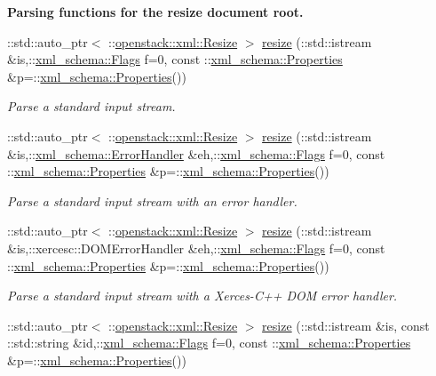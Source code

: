 \begin{Indent}{\bf Parsing functions for the resize document root.}
\begin{DoxyCompactItemize}
::std::auto\_\-ptr$<$ ::\hyperlink{classopenstack_1_1xml_1_1Resize}{openstack::xml::Resize} $>$ \hyperlink{namespaceopenstack_1_1xml_a12554fd6e38a6e9d8ddb3f9bea9f1494}{resize} (::std::istream \&is,::\hyperlink{namespacexml__schema_affb4c227cbd9aa7453dd1dc5a1401943}{xml\_\-schema::Flags} f=0, const ::\hyperlink{namespacexml__schema_ad27ce19a7ee1d3b1064092648898f64c}{xml\_\-schema::Properties} \&p=::\hyperlink{namespacexml__schema_ad27ce19a7ee1d3b1064092648898f64c}{xml\_\-schema::Properties}())
\begin{DoxyCompactList}\small\item\em Parse a standard input stream. \item\end{DoxyCompactList}\item 
::std::auto\_\-ptr$<$ ::\hyperlink{classopenstack_1_1xml_1_1Resize}{openstack::xml::Resize} $>$ \hyperlink{namespaceopenstack_1_1xml_ae7fc6ce3b8d429caba4f4bfb7f44478f}{resize} (::std::istream \&is,::\hyperlink{namespacexml__schema_ab1c9361bfd3b404eaabf0c31eded79dc}{xml\_\-schema::ErrorHandler} \&eh,::\hyperlink{namespacexml__schema_affb4c227cbd9aa7453dd1dc5a1401943}{xml\_\-schema::Flags} f=0, const ::\hyperlink{namespacexml__schema_ad27ce19a7ee1d3b1064092648898f64c}{xml\_\-schema::Properties} \&p=::\hyperlink{namespacexml__schema_ad27ce19a7ee1d3b1064092648898f64c}{xml\_\-schema::Properties}())
\begin{DoxyCompactList}\small\item\em Parse a standard input stream with an error handler. \item\end{DoxyCompactList}\item 
::std::auto\_\-ptr$<$ ::\hyperlink{classopenstack_1_1xml_1_1Resize}{openstack::xml::Resize} $>$ \hyperlink{namespaceopenstack_1_1xml_a67e6eee2f2f7285741ec6b18ce22813f}{resize} (::std::istream \&is,::xercesc::DOMErrorHandler \&eh,::\hyperlink{namespacexml__schema_affb4c227cbd9aa7453dd1dc5a1401943}{xml\_\-schema::Flags} f=0, const ::\hyperlink{namespacexml__schema_ad27ce19a7ee1d3b1064092648898f64c}{xml\_\-schema::Properties} \&p=::\hyperlink{namespacexml__schema_ad27ce19a7ee1d3b1064092648898f64c}{xml\_\-schema::Properties}())
\begin{DoxyCompactList}\small\item\em Parse a standard input stream with a Xerces-\/C++ DOM error handler. \item\end{DoxyCompactList}\item 
::std::auto\_\-ptr$<$ ::\hyperlink{classopenstack_1_1xml_1_1Resize}{openstack::xml::Resize} $>$ \hyperlink{namespaceopenstack_1_1xml_a799233fb22de533eed024647f24cb466}{resize} (::std::istream \&is, const ::std::string \&id,::\hyperlink{namespacexml__schema_affb4c227cbd9aa7453dd1dc5a1401943}{xml\_\-schema::Flags} f=0, const ::\hyperlink{namespacexml__schema_ad27ce19a7ee1d3b1064092648898f64c}{xml\_\-schema::Properties} \&p=::\hyperlink{namespacexml__schema_ad27ce19a7ee1d3b1064092648898f64c}{xml\_\-schema::Properties}())

\end{DoxyCompactItemize}
\end{Indent}
